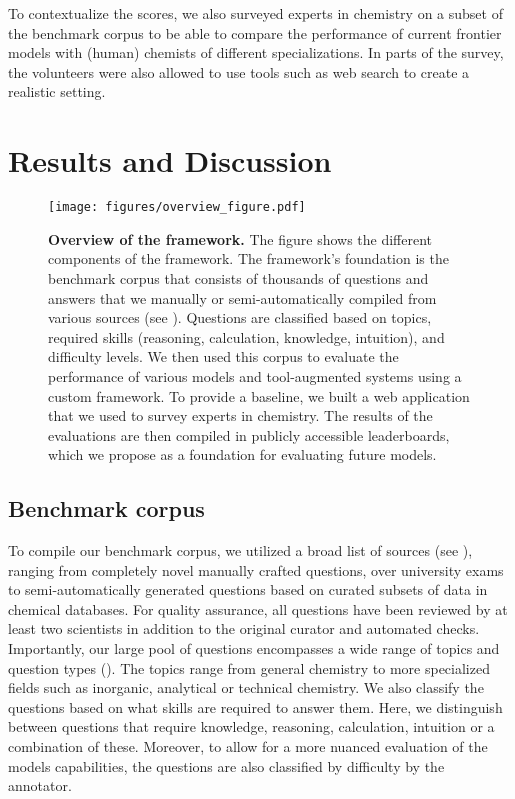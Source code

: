 \documentclass[11pt, oneside]{article}
\begin{document}
\begin{refsection}
To contextualize the scores, we also surveyed  experts in chemistry on a subset of the benchmark corpus to be able to compare the performance of current frontier models with (human) chemists of different specializations. In parts of the survey, the volunteers were also allowed to use tools such as web search to create a realistic setting.

\section{Results and Discussion}

\begin{figure}
    \texttt{[image: figures/overview\_figure.pdf]}
    \caption{\textbf{Overview of the \chembench framework.} The figure shows the different components of the \chembench framework.
    The framework's foundation is the benchmark corpus that consists of thousands of questions and answers that we manually or semi-automatically compiled from various sources (see ).
    Questions are classified based on topics, required skills (reasoning, calculation, knowledge, intuition), and difficulty levels.
    We then used this corpus to evaluate the performance of various models and tool-augmented systems using a custom framework. To provide a baseline, we built a web application that we used to survey experts in chemistry.
    The results of the evaluations are then compiled in publicly accessible leaderboards, which we propose as a foundation for evaluating future models.
    }
    \label{fig:overview_figure}
\end{figure}

\subsection{Benchmark corpus}

To compile our benchmark corpus, we utilized a broad list of sources (see ), ranging from completely novel manually crafted questions, over university exams to semi-automatically generated questions based on curated subsets of data in chemical databases.
For quality assurance, all questions have been reviewed by at least two scientists in addition to the original curator and automated checks.
Importantly, our large pool of questions encompasses a wide range of topics and question types (). The topics range from general chemistry to more specialized fields such as inorganic, analytical or technical chemistry.
We also classify the questions based on what skills are required to answer them. Here, we distinguish between questions that require knowledge, reasoning, calculation, intuition or a combination of these.
Moreover, to allow for a more nuanced evaluation of the models capabilities, the questions are also classified by difficulty by the annotator.


\end{refsection}
\end{document}
